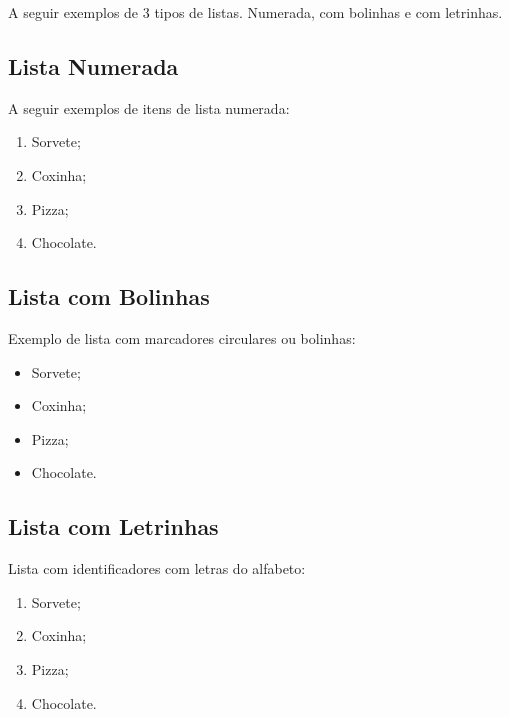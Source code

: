 A seguir exemplos de 3 tipos de listas. Numerada, com bolinhas e com letrinhas.

\subsection{Lista Numerada}

A seguir exemplos de itens de lista numerada:

\begin{enumerate}[leftmargin=1.7cm]
	\item Sorvete;
	
	\item Coxinha;
	
	\item Pizza;
	
	\item Chocolate.
\end{enumerate}

\subsection{Lista com Bolinhas}

Exemplo de lista com marcadores circulares ou bolinhas:

\begin{itemize}[leftmargin=1.7cm]
	\item Sorvete;
	
	\item Coxinha;
	
	\item Pizza;
	
	\item Chocolate.
\end{itemize}

\subsection{Lista com Letrinhas}

Lista com identificadores com letras do alfabeto:

\begin{enumerate}[label=\alph*), leftmargin=1.7cm]
	
	\item Sorvete;
	
	\item Coxinha;
	
	\item Pizza;
	
	\item Chocolate.
	
\end{enumerate}

